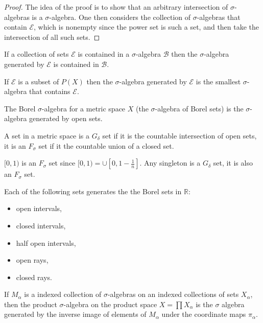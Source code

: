 \begin{proof} The idea of the proof is to show that an arbitrary intersection of $\sigma$-algebras is a $\sigma$-algebra.  One then considers the collection of $\sigma$-algebras that contain $ \mathcal{E}$, which is nonempty since the power set is such a set, and then take the intersection of all such sets.
\end{proof}

\begin{lem} If a collection of sets $\mathcal{E}$ is contained in a $\sigma$-algebra $\mathcal{B}$ then the $\sigma$-algebra generated by $\mathcal{E}$ is contained in $ \mathcal{B}$. \end{lem}

\begin{dfn} If $\mathcal{E}$ is a subset of $P(X)$ then the $\sigma$-algebra generated by $\mathcal{E}$ is the smallest $\sigma$-algebra that contains $\mathcal{E}$.
\end{dfn}

\begin{dfn} The Borel $\sigma$-algebra for a metric space $X$ (the $\sigma$-algebra of Borel sets) is the $\sigma$-algebra generated by open sets.
\end{dfn}

\begin{dfn} A set in a metric space is a $G_{\delta}$ set if it is the countable intersection of open sets, it is an $F_{\sigma}$ set if it the countable union of a closed set.
\end{dfn}

\begin{example} $[0,1)$ is an $F_{\sigma}$ set since $ [0,1) = \cup [0, 1- \frac{1}{n}]$.  Any singleton is a $G_{\delta}$ set, it is also an $F_{\sigma}$ set.
\end{example}

\begin{prop} Each of the following sets generates the the Borel sets in $ \mathbb{R}$:
\begin{itemize}
\item open intervals,
\item closed intervals,
\item half open intervals,
\item open rays,
\item closed rays.
\end{itemize} 
\end{prop}

\begin{dfn} If $M_{\alpha}$ is a indexed collection of $\sigma$-algebras on an indexed collections of sets $X_{\alpha}$, then the product $\sigma$-algebra on the product space $X = \prod X_{\alpha}$ is the $\sigma$ algebra generated by the inverse image of elements of $M_{\alpha}$ under the coordinate maps $\pi_{\alpha}$.
\end{dfn}

